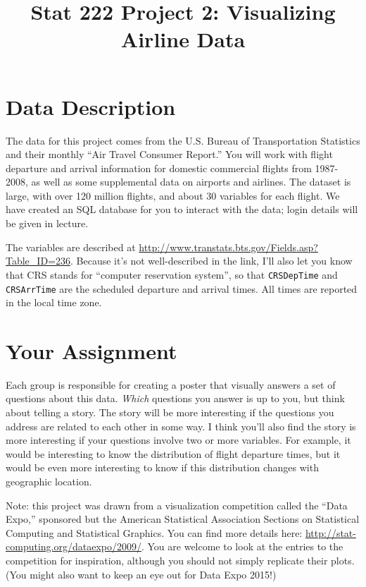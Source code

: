 \documentclass[11pt, oneside]{article}   	%
\title{Stat 222 Project 2: Visualizing Airline Data}
\date{}							%
\begin{document}
\maketitle

\section{Data Description}

The data for this project comes from the U.S. Bureau of Transportation Statistics and their monthly ``Air Travel Consumer Report.''  You will work with flight departure and arrival information for domestic commercial flights from 1987-2008, as well as some supplemental data on airports and airlines. The dataset is large, with over 120 million flights, and about 30 variables for each flight. We have created an SQL database for you to interact with the data; login details will be given in lecture.

The variables are described at \url{http://www.transtats.bts.gov/Fields.asp?Table_ID=236}. Because it's not well-described in the link, I'll also let you know that CRS stands for ``computer reservation system'', so that {\tt CRSDepTime}  and {\tt CRSArrTime} are the scheduled departure and arrival times. All times are reported in the local time zone.

\section{Your Assignment}

Each group is responsible for creating a poster that visually answers a set of questions about this data. {\em Which} questions you answer is up to you, but think about telling a story. The story will be more interesting if the questions you address are related to each other in some way.  I think you'll also find the story is more interesting if your questions involve two or more variables. For example, it would be interesting to know the distribution of flight departure times, but it would be even more interesting to know if this distribution changes with geographic location.

Note: this project was drawn from a visualization competition called the ``Data Expo,'' sponsored but the American Statistical Association Sections on Statistical Computing and Statistical Graphics. You can find more details here:
\url{http://stat-computing.org/dataexpo/2009/}. You are welcome to look at the entries to the competition for inspiration, although you should not simply replicate their plots. (You might also want to keep an eye out for Data Expo 2015!)
\end{document}
